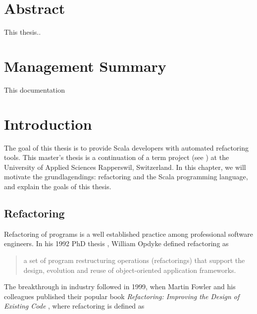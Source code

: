 \documentclass[10pt,a4paper,oneside]{scrreprt}
\begin{document}
\newcommand{\subtitlename}{Master's Thesis}
\newcommand{\titlename}{Refactoring Tool Support for Scala}



\emptypage

\chapter*{Abstract}


This thesis..


\chapter*{Management Summary}

This documentation 

\newpage

\setcounter{tocdepth}{2}

\tableofcontents

\newpage


\chapter{Introduction} \label{chapter:introduction}

The goal of this thesis is to provide Scala developers with automated refactoring tools. This master's thesis is a continuation of a term project (see \cite{ScalaRefactoring}) at the University of Applied Sciences Rapperswil, Switzerland. In this chapter, we will motivate the grundlagendings: refactoring and the Scala programming language, and explain the goals of this thesis.

\section{Refactoring}

Refactoring of programs is a well established practice among professional software engineers. In his 1992 PhD thesis \cite{OpdykeThesis}, William Opdyke defined refactoring as 

\begin{quotation}
a set of program restructuring operations (refactorings) that support the design, evolution and reuse of object-oriented application frameworks.
\end{quotation}

The breakthrough in industry followed in 1999, when Martin Fowler and his colleagues published their popular book \textit{Refactoring: Improving the Design of Existing Code} \cite{FowlerRefactoring}, where refactoring is defined as 
\end{document}

